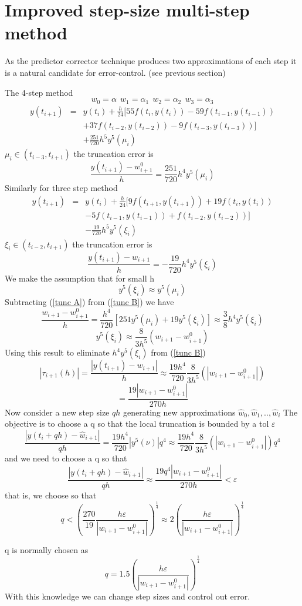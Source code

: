 \section{Improved step-size multi-step method}
As the predictor corrector technique produces two approximations of each step 
it is a natural candidate for error-control. (see previous section)
\begin{example}
The  4-step method
\[ w_0=\alpha \ \ w_1=\alpha_1 \ \ w_2 = \alpha_2 \ \ w_3=\alpha_3 \]
\begin{eqnarray*}
y(t_{i+1}) &=& y(t_{i})+\frac{h}{24}[55f(t_i,y(t_i)) -59 f(t_{i-1},y(t_{i-1}))\\ 
& & +37f(t_{i-2},y(t_{i-2})) -9 f(t_{i-3},y(t_{i-3}))]\\
& & + \frac{251}{720}h^5 y^5(\mu_i) \end{eqnarray*}
$\mu_i \in (t_{i-3},t_{i+1})$
the truncation error is
\begin{equation}
\label{tunc A}
\frac{y(t_{i+1})-w_{i+1}^0}{h}=\frac{251}{720}h^4 y^5(\mu_i)
\end{equation}
Similarly for  three step method
\begin{eqnarray*} y(t_{i+1}) &=& y(t_{i})+\frac{h}{24}[9f(t_{i+1},y(t_{i+1})) +19 f(t_{i},y(t_{i}))\\
& & -5f(t_{i-1},y(t_{i-1})) + f(t_{i-2},y(t_{i-2}))]\\ 
& &-\frac{19}{720}h^5 y^5(\xi_i) \end{eqnarray*}
$\xi_i \in (t_{i-2},t_{i+1})$
the truncation error is
\begin{equation}
\label{tunc B}
\frac{y(t_{i+1})-w_{i+1}}{h}=-\frac{19}{720}h^4 y^5(\xi_i)
\end{equation}
We make the assumption that for small h
\[y^5(\xi_i) \approx y^5(\mu_i)\]
Subtracting (\ref{tunc A}) from (\ref{tunc B}) we have
\[\frac{w_{i+1}-w_{i+1}^0}{h}=\frac{h^4}{720}[251y^5(\mu_i)+19y^5(\xi_i)]\approx
\frac{3}{8}h^4y^5(\xi_i) \]
\begin{equation}
y^5(\xi_i) \approx \frac{8}{3h^5}(w_{i+1}-w_{i+1}^0)
\end{equation}
Using this result to eliminate $h^4y^5(\xi_i)$ from (\ref{tunc B})
\[
|\tau_{i+1}(h)| = \frac{|y(t_{i+1})-w_{i+1}|}{h}\approx\frac{19h^4}{720}\frac{8}{3h^5}(|w_{i+1}-w_{i+1}^0|)\]
\[ =\frac{19|w_{i+1}-w_{i+1}^0|}{270h}\]
Now consider a new step size $qh$ generating new approximations $\hat{w}_0,\hat{w}_1,..,\hat{w}_i$
The objective is to choose a q so that the local truncation is bounded by a tol
$\varepsilon$
\[
\frac{|y(t_{i}+qh)-\hat{w}_{i+1}|}{qh}=\frac{19h^4}{720}|y^5(\nu)|q^4\approx\frac{19h^4}{720}\frac{8}{3h^5}(|w_{i+1}-w_{i+1}^0|)q^4
\]
and we need to choose a q so that
\[\frac{|y(t_{i}+qh)-\hat{w}_{i+1}|}{qh}\approx\frac{19q^4|w_{i+1}-w_{i+1}^0|}{270h} < \varepsilon \]
that is, we choose so that
\[ q < \left( \frac{270}{19}\frac{h\varepsilon}{|w_{i+1}-w_{i+1}^0|}\right)^{\frac{1}{4}}\approx 2\left( \frac{h\varepsilon}{|w_{i+1}-w_{i+1}^0|}\right)^{\frac{1}{4}}\]
\end{example}
q is normally chosen as 
\[ q = 1.5\left( \frac{h\varepsilon}{|w_{i+1}-w_{i+1}^0|}\right)^{\frac{1}{4}}\]
With this knowledge we can change step sizes and control out error.

